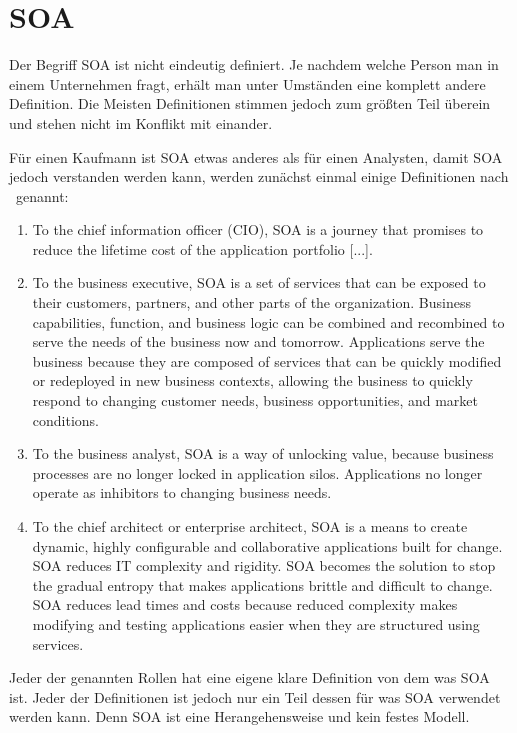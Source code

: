 \chapter{SOA}
\label{chap:soa}
Der Begriff SOA ist nicht eindeutig definiert. Je nachdem welche Person man in einem Unternehmen fragt, erhält man unter Umständen eine komplett andere Definition. \frqq Die Meisten Definitionen stimmen jedoch zum größten Teil überein und stehen nicht im Konflikt mit einander.\flqq\cite[vgl. Seite 6]{100QA}

Für einen Kaufmann ist SOA etwas anderes als für einen Analysten, damit SOA jedoch verstanden werden kann, werden zunächst einmal einige Definitionen nach \cite{100QA}\ genannt:
\begin{enumerate}
       \item \frqq To the chief information officer (CIO), SOA is a journey that
       promises to reduce the lifetime cost of the application portfolio [...].\flqq \cite[vgl. Seite 6]{100QA}
    
       \item \frqq To the business executive, SOA is a set of services that can be exposed to their customers, partners, and other parts of the organization. Business capabilities, function, and business logic can be combined and recombined to serve the needs of the business now and tomorrow. Applications serve the business because they are composed
       of services that can be quickly modified or redeployed in new
       business contexts, allowing the business to quickly respond to changing
       customer needs, business opportunities, and market conditions.\flqq \cite[vgl. Seite 6]{100QA}
       
       \item \frqq To the business analyst, SOA is a way of unlocking value, because business processes are no longer locked in application silos. Applications no longer operate as inhibitors to changing business needs.\flqq \cite[vgl. Seite 6]{100QA}
       
       \item \frqq To the chief architect or enterprise architect, SOA is a means to
       create dynamic, highly configurable and collaborative applications
       built for change. SOA reduces IT complexity and rigidity. SOA becomes the solution to stop the gradual entropy that makes applications
       brittle and difficult to change. SOA reduces lead times and costs
       because reduced complexity makes modifying and testing applications
       easier when they are structured using services.\flqq \cite[vgl. Seite ]{100QA}
\end{enumerate}
Jeder der genannten Rollen hat eine eigene klare Definition von dem was SOA ist. Jeder der Definitionen ist jedoch nur ein Teil dessen für was SOA verwendet werden kann. Denn SOA ist eine Herangehensweise und kein festes Modell.

